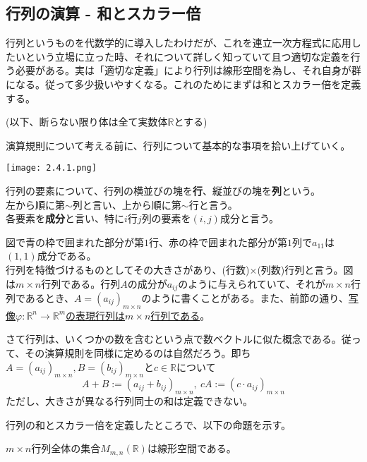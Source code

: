 \documentclass[dvipdfmx]{jsarticle}
\begin{document}
\subsection{行列の演算 - 和とスカラー倍}
\motiv 行列というものを代数学的に導入したわけだが、これを連立一次方程式に応用したいという立場に立った時、それについて詳しく知っていて且つ適切な定義を行う必要がある。実は「適切な定義」により行列は線形空間を為し、それ自身が群になる。従って多少扱いやすくなる。これのためにまずは和とスカラー倍を定義する。\\\par
\Build (以下、断らない限り体は全て実数体$\mathbb{R}$とする)\vspace{3pt}\par
演算規則について考える前に、行列について基本的な事項を拾い上げていく。\\
\begin{minipage}{3.5cm}
\texttt{[image: 2.4.1.png]}
\end{minipage}
\begin{minipage}{14cm}
行列の要素について、行列の横並びの塊を\textbf{行}、縦並びの塊を\textbf{列}という。\\
左から順に第$\sim$列と言い、上から順に第$\sim$行と言う。\\
各要素を\textbf{成分}と言い、特に$i$行$j$列の要素を$(i,j)$成分と言う。
\end{minipage}
図で青の枠で囲まれた部分が第$1$行、赤の枠で囲まれた部分が第$1$列で$a_{11}$は$(1,1)$成分である。\\
行列を特徴づけるものとしてその大きさがあり、(行数)$\times$(列数)行列と言う。図は$m \times n$行列である。行列$A$の成分が$a_{ij}$のように与えられていて、それが$m \times n$行列であるとき、$A=(a_{ij})_{m \times n}$のように書くことがある。また、前節の通り、\uline{写像$\varphi:\mathbb{R}^n \to \mathbb{R}^m$の表現行列は$m \times n$行列である}。\par
さて行列は、いくつかの数を含むという点で数ベクトルに似た概念である。従って、その演算規則を同様に定めるのは自然だろう。即ち\\
$A=(a_{ij})_{m \times n},B=(b_{ij})_{m \times n}$と$c\in\mathbb{R}$について
\[A+B:=(a_{ij}+b_{ij})_{m \times n},~cA:=(c \cdot a_{ij})_{m \times n}\]
ただし、大きさが異なる行列同士の和は定義できない。\\\par
行列の和とスカラー倍を定義したところで、以下の命題を示す。\\\par
{}$m \times n$行列全体の集合$M_{m,n}(\mathbb{R})$は線形空間である。\\\par
\end{document}
